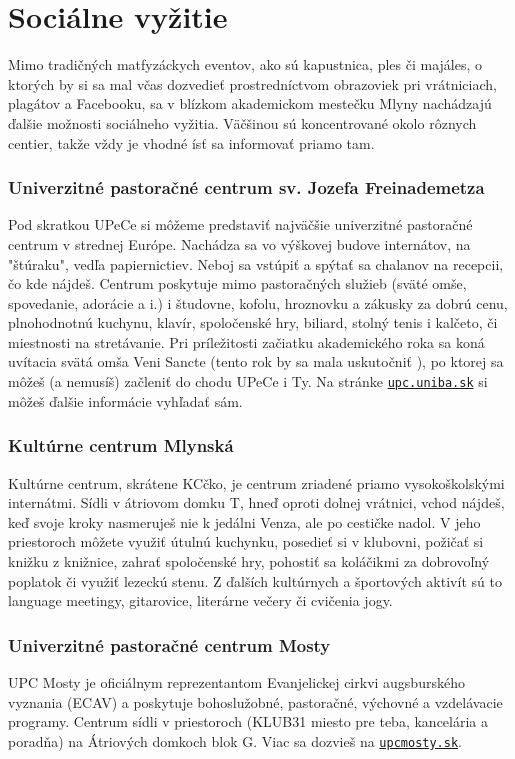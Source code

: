 \newpage
\chapter{Sociálne vyžitie}
Mimo tradičných matfyzáckych eventov, ako sú kapustnica, ples či majáles, o ktorých by si sa mal včas dozvedieť prostredníctvom obrazoviek pri vrátniciach, plagátov a Facebooku, sa v blízkom akademickom mestečku Mlyny nachádzajú ďalšie možnosti sociálneho vyžitia. Väčšinou sú koncentrované okolo rôznych centier, takže vždy je vhodné ísť sa informovať priamo tam.

\subsection*{Univerzitné pastoračné centrum sv. Jozefa Freinademetza}

Pod skratkou UPeCe si môžeme predstaviť najväčšie univerzitné pastoračné centrum v strednej Európe. Nachádza sa vo výškovej budove internátov, na "štúraku", vedľa papiernictiev. Neboj sa vstúpiť a spýtať sa chalanov na recepcii, čo kde nájdeš. Centrum poskytuje mimo pastoračných služieb (sväté omše, spovedanie, adorácie a i.) i študovne, kofolu, hroznovku a zákusky za dobrú cenu, plnohodnotnú kuchynu, klavír, spoločenské hry, biliard, stolný tenis i kalčeto, či miestnosti na stretávanie. Pri príležitosti začiatku akademického roka sa koná uvítacia svätá omša Veni Sancte (tento rok by sa mala uskutočniť {\veniSanctedd} \veniSancte), po ktorej sa môžeš (a nemusíš) začleniť do chodu UPeCe i Ty.
Na stránke \href{https://upc.uniba.sk}{\texttt{upc.uniba.sk}} si môžeš ďalšie informácie vyhľadať sám.


\subsection*{Kultúrne centrum Mlynská}

Kultúrne centrum, skrátene KCčko, je centrum zriadené priamo vysokoškolskými internátmi. Sídli v átriovom domku T, hneď oproti dolnej vrátnici, vchod nájdeš, keď svoje kroky nasmeruješ nie k jedálni Venza, ale po cestičke nadol. V jeho priestoroch môžete využiť útulnú kuchynku, posedieť si v klubovni, požičať si knižku z knižnice, zahrať spoločenské hry, pohostiť sa koláčikmi za dobrovoľný poplatok či využiť lezeckú stenu. Z ďalších kultúrnych a športových aktivít sú to language meetingy, gitarovice, literárne večery či cvičenia jogy.
 

\subsection*{Univerzitné pastoračné centrum Mosty}
UPC Mosty je oficiálnym reprezentantom Evanjelickej cirkvi augsburského vyznania (ECAV) a poskytuje bohoslužobné, pastoračné, výchovné a vzdelávacie programy. Centrum sídli v priestoroch (KLUB31 miesto pre teba, kancelária a poradňa) na Átriových domkoch blok G.
Viac sa dozvieš na \href{http://upcmosty.sk}{\texttt{upcmosty.sk}}.


